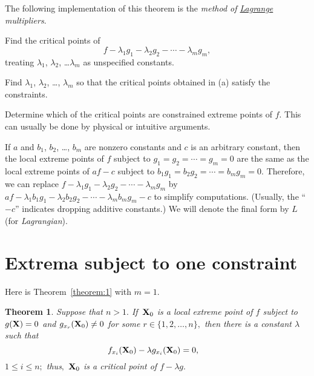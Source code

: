 \documentclass{article}
\newtheorem{theorem}{Theorem}
\newcounter{lcal}
\newenvironment{alist}{\begin{list}{\bf (\alph{lcal})}
{\topsep 0pt\partopsep 0pt\labelwidth 14pt
\labelsep 8pt\leftmargin 22pt\itemsep 0pt
\usecounter{lcal}}}{\end{list}}
\begin{document}
The following implementation of this theorem is  the \emph{method of
\href{http://www-history.mcs.st-and.ac.uk/Mathematicians/Lagrange.html}
{Lagrange} \\multipliers}.



\medskip
\begin{alist}
\item  Find the critical points of
$$
f-\lambda_{1}g_{1}-\lambda_{2}g_{2}-\cdots-\lambda_{m} g_{m},
$$
treating $\lambda_{1}$, $\lambda_{2}$, \dots $\lambda_{m}$ as
unspecified constants.

\item Find $\lambda_{1}$, $\lambda_{2}$, \dots, $\lambda_{m}$ so that the
critical points obtained in (a) satisfy the constraints.

\item  Determine which of the critical points are constrained
extreme points of  $f$. This can usually be done
by physical or intuitive arguments.
\end{alist}

\medskip

If $a$ and $b_{1}$, $b_{2}$, \dots, $b_{m}$ are  nonzero constants and $c$
is an arbitrary
constant, then   the local extreme points of  $f$ subject to
 $g_{1}=g_{2}= \cdots =g_{m}=0$  are the same as the
local extreme points of
$af-c$ subject to
$b_{1}g_{1}=b_{2}g_{2}=\cdots=b_{m}g_{m}=0$. Therefore,
we can replace
$f-\lambda_{1} g_{1}-\lambda_{2}g_{2}- \cdots-\lambda_{m} g_{m}$ by
$af-\lambda_{1}b_{1}g_{1}-\lambda_{2}b_{2}g_{2}- \cdots-
\lambda_{m}b_{m}g_{m}-c$ to simplify  computations.
 (Usually, the ``$-c$'' indicates dropping
additive constants.)
 We  will denote the final form by $L$ (for
\emph{Lagrangian}).

\section{Extrema subject to one constraint}  \label{section:3}

Here is Theorem~\ref{theorem:1} with $m=1$.

\begin{theorem} \label{theorem:2}
Suppose that  $n>1.$ If\,  ${\bf X}_{0}$ is a local extreme point of $f$
subject
to
$g({\bf
X})=0$ and $g_{x_{r}}({\bf X}_{0})\ne0$ for some $r\in\{1,2,\dots,n\},$
then there is a constant $\lambda$ such that
\begin{equation} \label{eq:7}
f_{x_{i}}({\bf X}_{0})-\lambda
g_{x_{i}}({\bf X}_{0})=0,\quad
\end{equation}
$1\le i\le n;$
thus$,$ ${\bf X}_{0}$ is a critical point of $f-\lambda g.$
\end{theorem}
\end{document}
